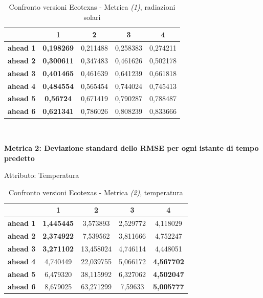 \documentclass[12pt,a4paper,oneside,openright]{book}
\begin{document}
\begin{table}[H]
\centering
\begin{tabular}{|c|c|c|c|c|}
\hline
& 1 & 2 & 3 & 4 \\
\hline
\textbf{ahead 1} & \textbf{0,198269} & 0,211488 & 0,258383 & 0,274211\\
\hline
\textbf{ahead 2} & \textbf{0,300611} & 0,347483 & 0,461626 & 0,502178\\ 
\hline
\textbf{ahead 3} & \textbf{0,401465} & 0,461639 & 0,641239 & 0,661818\\
\hline
\textbf{ahead 4} & \textbf{0,484554} & 0,565454 & 0,744024 & 0,745413\\ 
\hline
\textbf{ahead 5} & \textbf{0,56724} & 0,671419 & 0,790287 & 0,788487\\
\hline
\textbf{ahead 6} & \textbf{0,621341} & 0,786026 & 0,808239 & 0,833666\\ 
\hline
\end{tabular} \\
\caption{Confronto versioni Ecotexas - Metrica \textit{(1)}, radiazioni solari}
\end{table} 


\newpage

\textbf{Metrica 2: Deviazione standard dello RMSE per ogni istante di tempo predetto} 

\medskip

Attributo: Temperatura \\ 

\begin{table}[H]
\centering
\begin{tabular}{|c|c|c|c|c|}
\hline
& 1 & 2 & 3 & 4 \\
\hline
\textbf{ahead 1} & \textbf{1,445445} & 3,573893 & 2,529772 & 4,118029\\
\hline
\textbf{ahead 2} & \textbf{2,374922} & 7,539562 & 3,811666 & 4,752247\\ 
\hline
\textbf{ahead 3} & \textbf{3,271102} & 13,458024 & 4,746114 & 4,448051\\
\hline
\textbf{ahead 4} & 4,740449 & 22,039755 & 5,066172 & \textbf{4,567702}\\ 
\hline
\textbf{ahead 5} & 6,479320 & 38,115992 & 6,327062 & \textbf{4,502047}\\
\hline
\textbf{ahead 6} & 8,679025 & 63,271299 & 7,59633 & \textbf{5,005777}\\ 
\hline
\end{tabular} \\
\caption{Confronto versioni Ecotexas - Metrica \textit{(2)}, temperatura}
\end{table} 
\end{document}
